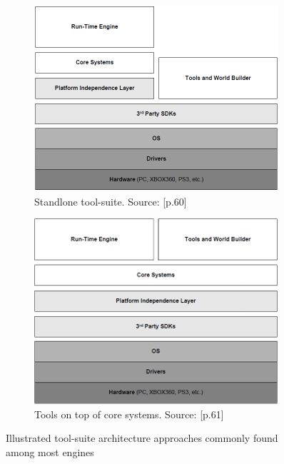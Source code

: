 \begin{figure}[!ht]
	\centering
	\begin{subfigure}{0.5\textwidth}
		\centering
		\includegraphics[width=0.95\linewidth]{PICs/tools_arch_standalone.png}
		\caption{Standlone tool-suite. Source: \cite{GEA_2}[p.60]}
		\label{fig:tools_standalone}
	\end{subfigure}%
	\begin{subfigure}{0.5\textwidth}
		\centering
		\includegraphics[width=0.95\linewidth]{PICs/tools_arch_integrated.png}
		\caption{Tools on top of core systems. Source: \cite{GEA_2}[p.61]}
		\label{fig:tools_integrated}
	\end{subfigure}
	
	\caption{Illustrated tool-suite architecture approaches commonly found among most engines}
\end{figure}

